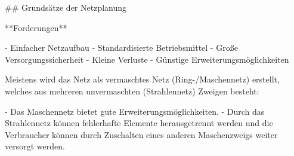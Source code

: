 \begin{markdown}
## Grundsätze der Netzplanung

**Forderungen**

- Einfacher Netzaufbau
- Standardisierte Betriebsmittel
- Große Versorgungssicherheit
- Kleine Verluste
- Günstige Erweiterungsmöglichkeiten

Meistens wird das Netz als vermaschtes Netz (Ring-/Maschennetz) erstellt, welches aus mehreren unvermaschten (Strahlennetz) Zweigen besteht:

- Das Maschennetz bietet gute Erweiterungsmöglichkeiten.
- Durch das Strahlennetz können fehlerhafte Elemente herausgetrennt werden und die Verbraucher können durch Zuschalten eines anderen Maschenzweigs weiter versorgt werden.

\end{markdown}